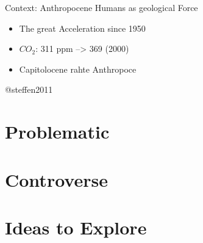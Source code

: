 \documentclass[
  ignorenonframetext,
  aspectratio=169,
  c]{beamer}
\begin{document}
\begin{frame}{Context: Anthropocene Humans as geological Force}
\begin{itemize}
\item
  The great Acceleration since 1950
\item
  \(CO_{2}\): 311 ppm --\textgreater{} 369 (2000)
\item
  Capitolocene rahte Anthropoce
\end{itemize}

@steffen2011
\end{frame}

\section{Problematic}\label{problematic}

\section{Controverse}\label{controverse}

\section{Ideas to Explore}\label{ideas-to-explore}
\end{document}
